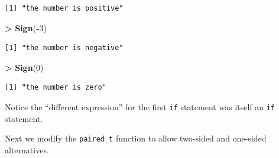 \documentclass[]{krantz}
\makeatletter
\newenvironment{Shaded}{\begin{snugshade}}{\end{snugshade}}
\newcommand{\KeywordTok}[1]{\textcolor[rgb]{0.27,0.27,0.27}{\textbf{#1}}}
\newcommand{\DecValTok}[1]{\textcolor[rgb]{0.06,0.06,0.06}{#1}}
\newcommand{\StringTok}[1]{\textcolor[rgb]{0.5,0.5,0.5}{#1}}
\newcommand{\OperatorTok}[1]{\textcolor[rgb]{0.43,0.43,0.43}{\textbf{#1}}}
\newcommand{\NormalTok}[1]{#1}
\newenvironment{kframe}{%
\medskip{}
\setlength{\fboxsep}{.8em}
 \def\at@end@of@kframe{}%
 \ifinner\ifhmode%
  \def\at@end@of@kframe{\end{minipage}}%
  \begin{minipage}{\columnwidth}%
 \fi\fi%
 \def\FrameCommand##1{\hskip\@totalleftmargin \hskip-\fboxsep
 \colorbox{shadecolor}{##1}\hskip-\fboxsep
     \hskip-\linewidth \hskip-\@totalleftmargin \hskip\columnwidth}%
 \MakeFramed {\advance\hsize-\width
   \@totalleftmargin\z@ \linewidth\hsize
   \@setminipage}}%
 {\par\unskip\endMakeFramed%
 \at@end@of@kframe}
\renewenvironment{Shaded}{\begin{kframe}}{\end{kframe}}
\makeatother
\begin{document}
\begin{verbatim}
[1] "the number is positive"
\end{verbatim}

\begin{Shaded}
\begin{Highlighting}[]
\OperatorTok{>}\StringTok{ }\KeywordTok{Sign}\NormalTok{(}\OperatorTok{-}\DecValTok{3}\NormalTok{)}
\end{Highlighting}
\end{Shaded}

\begin{verbatim}
[1] "the number is negative"
\end{verbatim}

\begin{Shaded}
\begin{Highlighting}[]
\OperatorTok{>}\StringTok{ }\KeywordTok{Sign}\NormalTok{(}\DecValTok{0}\NormalTok{)}
\end{Highlighting}
\end{Shaded}

\begin{verbatim}
[1] "the number is zero"
\end{verbatim}

Notice the ``different expression'' for the first \texttt{if} statement
was itself an \texttt{if} statement.

Next we modify the \texttt{paired\_t} function to allow two-sided and
one-sided alternatives.
\end{document}
